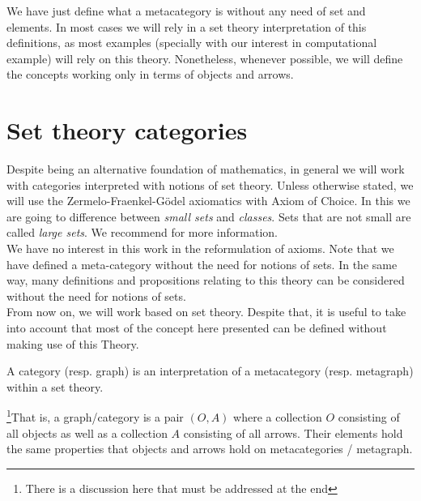 We have just define what a  metacategory is without any need of set and elements. In most cases we will rely in a set theory interpretation of this definitions, as most examples (specially with our interest in computational example) will rely on this theory. Nonetheless, whenever possible, we will define the concepts working only in terms of objects and arrows.\\






\section{Set theory categories}
Despite being an alternative foundation of mathematics, in general we will work with categories interpreted with notions of set theory. Unless otherwise stated, we will use the Zermelo-Fraenkel-Gödel axiomatics with Axiom of Choice. In this we are going to difference between \emph{small sets} and \emph{classes}. Sets that are not small are called \emph{large sets}. We recommend \cite{kunen2014set} for more information.\\

We have no interest in this work in the reformulation of axioms. Note that  we have defined a meta-category without the need for notions of sets. In the same way,  many definitions and propositions relating to this theory can be considered without the need for notions of sets.\\


From now on, we will work based on set theory. Despite that, it is useful to take into account that most of the concept here presented can be defined without making use of this Theory. 

\begin{definition}
  A category (resp. graph) is an interpretation of a metacategory (resp. metagraph) within a set theory.
\end{definition}


\footnote{{\color{black} There is a discussion here that must be addressed at the end}}That is, a graph/category is a pair $(O,A)$ where a collection $O$ consisting of all objects as well as a collection $A$ consisting of all arrows. Their elements hold the same properties that objects and arrows hold on metacategories / metagraph.\\


